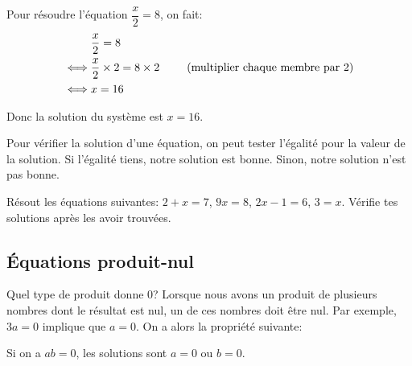 \begin{exemple}
    Pour résoudre l'équation $\dfrac{x}{2} = 8$, on fait:
    \begin{alignat*}{3}
        & \dfrac{x}{2} = 8&\\
        \iff & \dfrac{x}{2} \times 2 = 8 \times 2& \hspace{5mm} \text{(multiplier chaque membre par 2)}\\
        \iff & x = 16&
    \end{alignat*}

    Donc la solution du système est $x = 16$.
\end{exemple}

\begin{astuce}
    Pour vérifier la solution d'une équation, on peut tester l'égalité pour la valeur de la solution. Si l'égalité tiens, notre solution est bonne. Sinon, notre solution n'est pas bonne.
\end{astuce}

\begin{exercicefr}
    Résout les équations suivantes: $2 + x = 7$, $9x = 8$, $2x - 1 = 6$, $3 = x$. Vérifie tes solutions après les avoir trouvées.
\end{exercicefr}


\subsection{Équations produit-nul}

Quel type de produit donne 0? Lorsque nous avons un produit de plusieurs nombres dont le résultat est nul, un de ces nombres doit être nul. Par exemple, $3a = 0$ implique que $a=0$. On a alors la propriété suivante:

\begin{propriete}
    Si on a $ab = 0$, les solutions sont $a = 0$ ou $b = 0$.
\end{propriete}